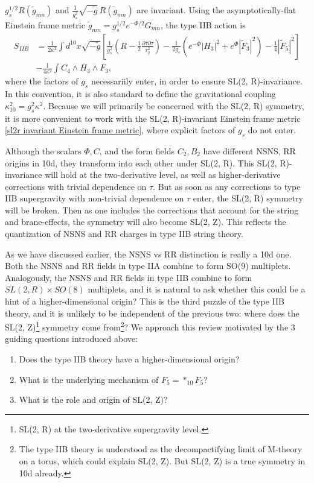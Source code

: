 {$g_s^{1/2}R(\tilde{g}_{mn})$ and $\frac{1}{g_s^2}\sqrt{-\tilde{g}}\,R(\tilde{g}_{mn})$ are invariant.
Using the asymptotically-flat Einstein frame metric $\tilde{g}_{mn} = g_s^{1/2}e^{-\Phi/2}G_{mn}$, the type IIB action is
\begin{equation}
\begin{aligned}
S_{IIB}
&=\frac{1}{2\kappa^2} \int d^{10}x\sqrt{-\tilde{g}}\left[
\frac{1}{g_s^2}\left(R-\frac{1}{2}\frac{\partial\bar\tau\partial\tau}{\tau_2^2}\right)
-\frac{1}{2 g_s}\left(
e^{-\Phi}|H_3|^2+e^\Phi|\tilde{F}_3|^2
\right)
-\frac{1}{4}|\tilde F_5|^2
\right]\\
&-\frac{1}{4\kappa^2}\int C_4\wedge H_3\wedge F_3,
\end{aligned}
\label{eq:asymptotically_flat_einstein_frame_action}
\end{equation}
where the factors of $g_s$ necessariily enter, in order to ensure SL(2, R)-invariance.
In this convention, it is also standard to define the gravitational coupling $\kappa_{10}^2 = g_s^2 \kappa^2$.
Because we will primarily be concerned with the SL(2, R) symmetry, it is more convenient to work with the SL(2, R)-invariant Einstein frame metric \eqref{sl2r invariant Einstein frame metric}, where explicit factors of $g_s$ do not enter.

Although the scalars $\Phi, C$, and the form fields $C_2, B_2$ have different NSNS, RR origins in 10d, they transform into each other under SL(2, R). 
This SL(2, R)-invariance will hold at the two-derivative level, as well as higher-derivative corrections with trivial dependence on $\tau$.
But as soon as any corrections to type IIB supergravity with non-trivial dependence on $\tau$ enter, the SL(2, R) symmetry will be broken.
Then as one includes the corrections that account for the string and brane-effects, the symmetry will also become SL(2, Z).
This reflects the quantization of NSNS and RR charges in type IIB string theory.
}

{\color{red}
As we have discussed earlier, the NSNS vs RR distinction is really a 10d one.
Both the NSNS and RR fields in type IIA combine to form SO(9) multiplets.
Analogously, the NSNS and RR fields in type IIB combine to form $SL(2, R)\times SO(8)$ multiplets, and it is natural to ask whether this could be a hint of a higher-dimensional origin?
This is the third puzzle of the type IIB theory, and it is unlikely to be independent of the previous two: where does the SL(2, Z)\footnote{
SL(2, R) at the two-derivative supergravity level.
} symmetry come from\footnote{
The type IIB theory is understood as the decompactifying limit of M-theory on a torus, which could explain SL(2, Z). But SL(2, Z) is a true symmetry in 10d already.}?
We approach this review motivated by the 3 guiding questions introduced above:
\begin{enumerate}
    \item Does the type IIB theory have a higher-dimensional origin?
    \item What is the underlying mechanism of $F_5 = *_{10}F_5$?
    \item What is the role and origin of SL(2, Z)?
\end{enumerate}
}